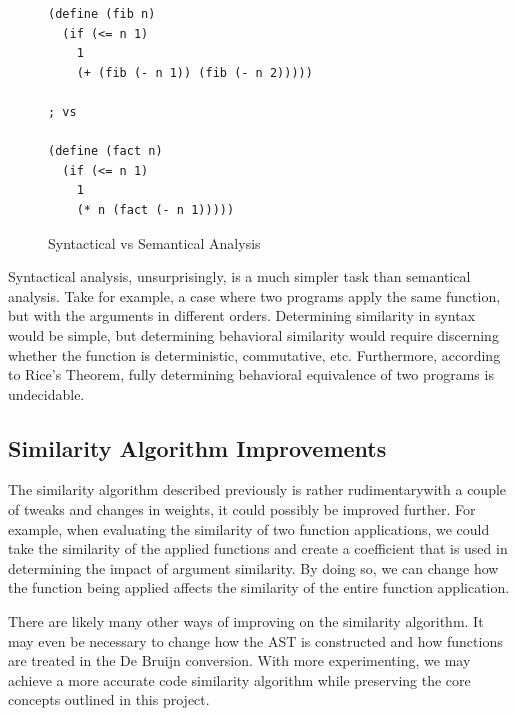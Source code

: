 \documentclass[12pt]{article}
\begin{document}
\begin{figure}[H]
  \begin{mdframed}
    \begin{verbatim}
(define (fib n)
  (if (<= n 1)
    1
    (+ (fib (- n 1)) (fib (- n 2)))))

; vs

(define (fact n)
  (if (<= n 1)
    1
    (* n (fact (- n 1)))))
    \end{verbatim}
  \end{mdframed}
  \caption{Syntactical vs Semantical Analysis}
  \label{syntax-vs-sematics}
\end{figure}

Syntactical analysis, unsurprisingly, is a much simpler task than semantical analysis. Take for example, a case where two programs apply the same function, but with the arguments in different orders. Determining similarity in syntax would be simple, but determining behavioral similarity would require discerning whether the function is deterministic, commutative, etc. Furthermore, according to Rice's Theorem, fully determining behavioral equivalence of two programs is undecidable.

\subsection{Similarity Algorithm Improvements}

The similarity algorithm described previously is rather rudimentary\textemdash with a couple of tweaks and changes in weights, it could possibly be improved further. For example, when evaluating the similarity of two function applications, we could take the similarity of the applied functions and create a coefficient that is used in determining the impact of argument similarity. By doing so, we can change how the function being applied affects the similarity of the entire function application. 

\hfill

There are likely many other ways of improving on the similarity algorithm. It may even be necessary to change how the AST is constructed and how functions are treated in the De Bruijn conversion. With more experimenting, we may achieve a more accurate code similarity algorithm while preserving the core concepts outlined in this project.
\end{document}
